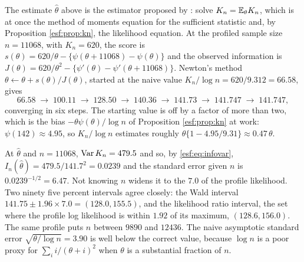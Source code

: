 \begin{example}
\label{esf:ex:estimate}
The estimate $\hat\theta$ above is the estimator proposed by \citet{esf:ewens1972}:
solve $K_n = \mathbb{E}_\theta K_n$, which is at once the method of moments equation for the
sufficient statistic and, by Proposition \ref{esf:prop:kn}, the likelihood equation.
At the profiled sample size $n = 11068$, with $K_n = 620$, the score is
$s(\theta) = 620/\theta - \{\psi(\theta + 11068) - \psi(\theta)\}$ and the observed
information is $J(\theta) = 620/\theta^{2} - \{\psi'(\theta) - \psi'(\theta+11068)\}$.
Newton's method $\theta \leftarrow \theta + s(\theta)/J(\theta)$, started at the naive
value $K_n/\log n = 620/9.312 = 66.58$, gives
\[
66.58 \;\to\; 100.11 \;\to\; 128.50 \;\to\; 140.36 \;\to\; 141.73 \;\to\; 141.747
\;\to\; 141.747 ,
\]
converging in six steps. The starting value is off by a factor of more than two,
which is the bias $-\theta\psi(\theta)/\log n$ of Proposition \ref{esf:prop:kn} at work:
$\psi(142) \approx 4.95$, so $K_n/\log n$ estimates roughly
$\theta\{1 - 4.95/9.31\} \approx 0.47\,\theta$.

At $\hat\theta$ and $n = 11068$, $\operatorname{Var} K_n = 479.5$ and so, by \eqref{esf:eq:infovar},
$I_n(\hat\theta) = 479.5/141.7^{2} = 0.0239$ and the standard error given $n$ is
$0.0239^{-1/2} = 6.47$. Not knowing $n$ widens it to the $7.0$ of the profile likelihood. Two ninety five percent intervals agree closely: the Wald
interval $141.75 \pm 1.96 \times 7.0 = (128.0, 155.5)$, and the likelihood ratio interval, the set where
the profile log likelihood is within $1.92$ of its maximum, $(128.6, 156.0)$. The same profile puts $n$ between $9890$ and $12436$. The naive
asymptotic standard error $\sqrt{\theta/\log n} = 3.90$ is well below the correct value,
because $\log n$ is a poor proxy for $\sum_i i/(\theta+i)^{2}$ when $\theta$ is a
substantial fraction of $n$.


\end{example}
